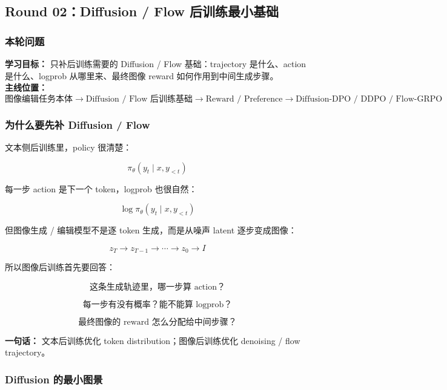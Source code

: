 
\subsection{Round 02：Diffusion / Flow 后训练最小基础}

\subsubsection{本轮问题}

\begin{conceptbox}
\textbf{学习目标：} 只补后训练需要的 Diffusion / Flow 基础：trajectory 是什么、action 是什么、logprob 从哪里来、最终图像 reward 如何作用到中间生成步骤。\\
\textbf{主线位置：}
\[
\text{图像编辑任务本体}
\to
\text{Diffusion / Flow 后训练基础}
\to
\text{Reward / Preference}
\to
\text{Diffusion-DPO / DDPO / Flow-GRPO}
\]
\end{conceptbox}

\subsubsection{为什么要先补 Diffusion / Flow}

文本侧后训练里，policy 很清楚：

\[
\pi_\theta(y_t \mid x,y_{<t})
\]

每一步 action 是下一个 token，logprob 也很自然：

\[
\log \pi_\theta(y_t \mid x,y_{<t})
\]

但图像生成 / 编辑模型不是逐 token 生成，而是从噪声 latent 逐步变成图像：

\[
z_T
\to
z_{T-1}
\to
\cdots
\to
z_0
\to
I
\]

所以图像后训练首先要回答：

\[
\text{这条生成轨迹里，哪一步算 action？}
\]

\[
\text{每一步有没有概率？能不能算 logprob？}
\]

\[
\text{最终图像的 reward 怎么分配给中间步骤？}
\]

\begin{summarybox}
\textbf{一句话：} 文本后训练优化 token distribution；图像后训练优化 denoising / flow trajectory。
\end{summarybox}

\subsubsection{Diffusion 的最小图景}

